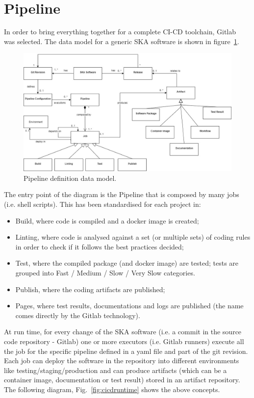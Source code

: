 \documentclass[a4paper]{spie}  %
\begin{document}
\section{Pipeline} \label{pipeline}

In order to bring everything together for a complete CI-CD toolchain, Gitlab~\cite{gitlab} was selected. The data model for a generic SKA software is shown in figure~\ref{fig:pipelinedatamodel}.

\begin{figure}[!htb]
   \centering
   \includegraphics*[width=0.8\columnwidth]{dataEntity}
   \caption{Pipeline definition data model.}
   \label{fig:pipelinedatamodel}
\end{figure}

The entry point of the diagram is the Pipeline that is composed by many jobs (i.e. shell scripts). This has been standardised for each project in:
\begin{itemize}
    \item Build, where code is compiled and a docker image is created;
    \item Linting, where code is analysed against a set (or multiple sets) of coding rules in order to check if it follows the best practices decided;
    \item Test, where the compiled package (and docker image) are tested; tests are grouped into Fast / Medium / Slow / Very Slow categories.
    \item Publish, where the coding artifacts are published;
    \item Pages, where test results, documentations and logs are published (the name comes directly by the Gitlab technology). 
\end{itemize}

At run time, for every change of the SKA software (i.e. a commit in the source code repository - Gitlab) one or more executors (i.e. Gitlab runners) execute all the job for the specific pipeline defined in a yaml file and part of the git revision. Each job can deploy the software in the repository into different environments like testing/staging/production and can produce artifacts (which can be a container image, documentation or test result) stored in an artifact repository. The following diagram, Fig.~\ref{fig:cicdruntime} shows the above concepts.
\end{document}
